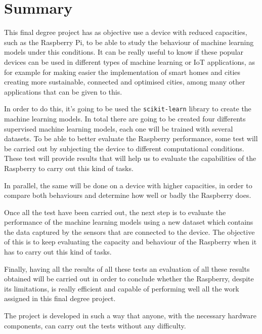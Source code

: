 \documentclass[a4paper, 12pt]{book}
\begin{document}
\chapter*{Summary}

This final degree project has as objective use a device with reduced capacities, such as the Raspberry Pi, to be able to study the behaviour of machine learning models under this conditions. It can be really useful to know if these popular devices can be used in different types of machine learning or IoT applications, as for example for making easier the implementation of smart homes and cities creating more sustainable, connected and optimised cities, among many other applications that can be given to this.

In order to do this, it's going to be used the \texttt{scikit-learn} library to create the machine learning models. In total there are going to be created four differents supervised machine learning models, each one will be trained with several datasets. To be able to better evaluate the Raspberry performance, some test will be carried out by subjecting the device to different computational conditions. These test will provide results that will help us to evaluate the capabilities of the Raspberry to carry out this kind of tasks.

In parallel, the same will be done on a device with higher capacities, in order to compare both behaviours and determine how well or badly the Raspberry does.

Once all the test have been carried out, the next step is to evaluate the performance of the machine learning models using a new dataset which contains the data captured by the sensors that are connected to the device. The objective of this is to keep evaluating the capacity and behaviour of the Raspberry when it has to carry out this kind of tasks.

Finally, having all the results of all these tests an evaluation of all these results obtained will be carried out in order to conclude whether the Raspberry, despite its limitations, is really efficient and capable of performing well all the work assigned in this final degree project.

The project is developed in such a way that anyone, with the necessary hardware components, can carry out the tests without any difficulty.

\end{document}
